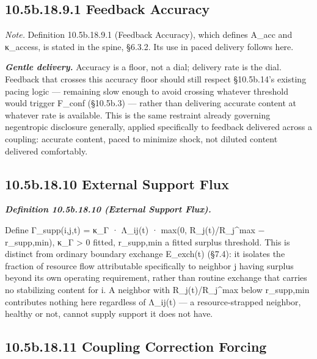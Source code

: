 \documentclass[
]{article}
\begin{document}
\hypertarget{b.18.9.1-feedback-accuracy}{%
\subsection{10.5b.18.9.1 Feedback
Accuracy}\label{b.18.9.1-feedback-accuracy}}

\emph{Note.} Definition 10.5b.18.9.1 (Feedback Accuracy), which defines
A\_acc and κ\_access, is stated in the spine, §6.3.2. Its use in paced
delivery follows here.

\emph{\textbf{Gentle delivery.}} Accuracy is a floor, not a dial;
delivery rate is the dial. Feedback that crosses this accuracy floor
should still respect §10.5b.14's existing pacing logic --- remaining
slow enough to avoid crossing whatever threshold would trigger F\_conf
(§10.5b.3) --- rather than delivering accurate content at whatever rate
is available. This is the same restraint already governing negentropic
disclosure generally, applied specifically to feedback delivered across
a coupling: accurate content, paced to minimize shock, not diluted
content delivered comfortably.

\hypertarget{b.18.10-external-support-flux}{%
\subsection{10.5b.18.10 External Support
Flux}\label{b.18.10-external-support-flux}}

\emph{\textbf{Definition 10.5b.18.10 (External Support Flux).}}

Define Γ\_supp(i,j,t) = κ\_Γ · Λ\_ij(t) · max(0, R\_j(t)/R\_j\^{}max −
r\_supp,min), κ\_Γ \textgreater{} 0 fitted, r\_supp,min a fitted surplus
threshold. This is distinct from ordinary boundary exchange E\_exch(t)
(§7.4): it isolates the fraction of resource flow attributable
specifically to neighbor j having surplus beyond its own operating
requirement, rather than routine exchange that carries no stabilizing
content for i. A neighbor with R\_j(t)/R\_j\^{}max below r\_supp,min
contributes nothing here regardless of Λ\_ij(t) --- a resource-strapped
neighbor, healthy or not, cannot supply support it does not have.

\hypertarget{b.18.11-coupling-correction-forcing}{%
\subsection{10.5b.18.11 Coupling Correction
Forcing}\label{b.18.11-coupling-correction-forcing}}
\end{document}
